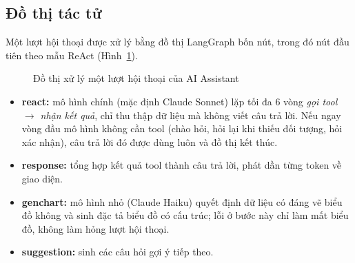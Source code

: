 \subsection{Đồ thị tác tử}

Một lượt hội thoại được xử lý bằng đồ thị LangGraph \cite{langgraph} bốn nút,
trong đó nút đầu tiên theo mẫu ReAct \cite{yao2023react}
(Hình~\ref{fig:assistant-graph}).

\begin{figure}[H]
\centering
{}
\caption{Đồ thị xử lý một lượt hội thoại của AI Assistant}
\label{fig:assistant-graph}
\end{figure}

\begin{itemize}
  \item \textbf{react:} mô hình chính (mặc định Claude Sonnet) lặp tối đa 6 vòng
        \emph{gọi tool $\rightarrow$ nhận kết quả}, chỉ thu thập dữ liệu mà không
        viết câu trả lời. Nếu ngay vòng đầu mô hình không cần tool (chào hỏi, hỏi
        lại khi thiếu đối tượng, hỏi xác nhận), câu trả lời đó được dùng luôn và đồ
        thị kết thúc.
  \item \textbf{response:} tổng hợp kết quả tool thành câu trả lời, phát dần từng
        token về giao diện.
  \item \textbf{genchart:} mô hình nhỏ (Claude Haiku) quyết định dữ liệu có đáng
        vẽ biểu đồ không và sinh đặc tả biểu đồ có cấu trúc; lỗi ở bước này chỉ làm
        mất biểu đồ, không làm hỏng lượt hội thoại.
  \item \textbf{suggestion:} sinh các câu hỏi gợi ý tiếp theo.
\end{itemize}

